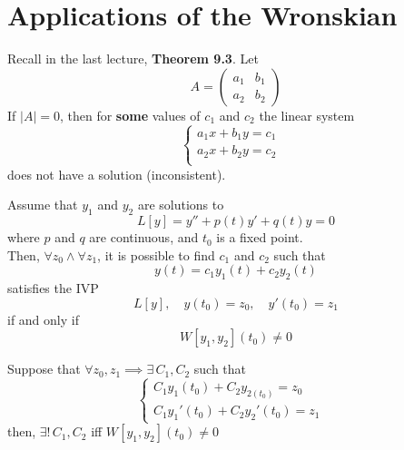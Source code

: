 \documentclass[twoside]{report}
\begin{document}
    \section{Applications of the Wronskian}
    \begin{corollary}
        Recall in the last lecture, \textbf{Theorem 9.3}.
        Let
        \begin{equation}
            A = \begin{pmatrix}
                a_{1} & b_{1}\\
                a_{2} & b_{2}
            \end{pmatrix}
        \end{equation}
        If $|A| = 0$, then for \textbf{some} values of $c_{1}$ and $c_{2}$ the linear system
        \begin{equation}
            \begin{cases}
                a_{1}x + b_{1}y = c_{1}&\\
                a_{2}x + b_{2}y = c_{2}&\\
            \end{cases}
        \end{equation}
        does not have a solution (inconsistent).
    \end{corollary}
    \np
    \begin{btheorem}
        Assume that $y_{1}$ and $y_{2}$ are solutions to
        \begin{equation}
            L[y] = y'' + p(t)y' + q(t)y = 0
        \end{equation}
        where $p$ and $q$ are continuous, and $t_{0}$ is a fixed point.\\
        Then, $\forall z_{0} \wedge \forall z_{1}$, it is possible to find $c_{1}$ and $c_{2}$ such that
        \begin{equation}
            y(t) = c_{1}y_{1}(t) + c_{2}y_{2}(t)
        \end{equation}
        satisfies the IVP
        \begin{equation}
            L[y],\quad  y(t_{0}) = z_{0},\quad y'(t_{0}) = z_{1}
        \end{equation}
        if and only if
        \begin{equation}
            W[y_{1}, y_{2}](t_{0}) \neq 0
        \end{equation}
    \end{btheorem}
    \begin{bproof}
        Suppose that $\forall z_{0}, z_{1} \implies \exists\, C_{1}, C_{2}$ such that
        \begin{equation}
            \begin{cases}
                C_{1}y_{1}(t_{0}) + C_{2}y_{2(t_{0})} = z_{0}&\\
                C_{1}y_{1}'(t_{0}) + C_{2}y_{2}'(t_{0}) = z_{1}&
            \end{cases}
        \end{equation}
        then, $\exists!\,C_{1}, C_{2}$ iff $W[y_{1}, y_{2}](t_{0}) \neq 0$
    \end{bproof}
\end{document}
